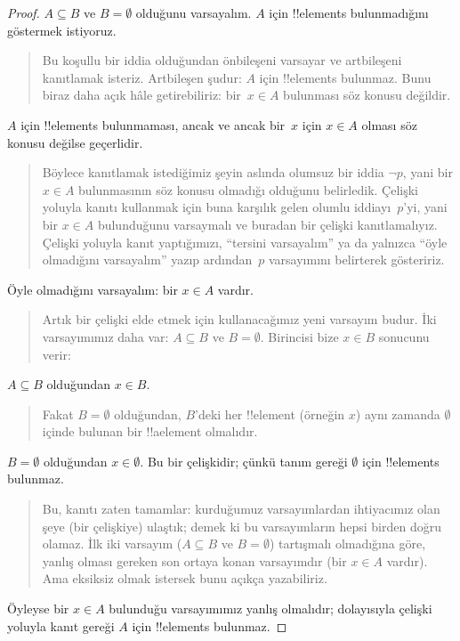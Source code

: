 \begin{proof}
  $A \subseteq B$ ve $B = \emptyset$ olduğunu varsayalım. $A$ için
  !!{element}s bulunmadığını göstermek istiyoruz.
  \begin{quote}
    Bu koşullu bir iddia olduğundan önbileşeni varsayar ve artbileşeni
    kanıtlamak isteriz. Artbileşen şudur: $A$ için !!{element}s
    bulunmaz. Bunu biraz daha açık hâle getirebiliriz: bir~$x \in A$
    bulunması söz konusu değildir.
  \end{quote}
  $A$ için !!{element}s bulunmaması, ancak ve ancak bir~$x$ için $x \in A$
  olması söz konusu değilse geçerlidir.
  \begin{quote}
    Böylece kanıtlamak istediğimiz şeyin aslında olumsuz bir iddia
    $\lnot p$, yani bir $x \in A$ bulunmasının söz konusu olmadığı
    olduğunu belirledik. Çelişki yoluyla kanıtı kullanmak için buna
    karşılık gelen olumlu iddiayı~$p$'yi, yani bir $x \in A$ bulunduğunu
    varsaymalı ve buradan bir çelişki kanıtlamalıyız. Çelişki yoluyla
    kanıt yaptığımızı, ``tersini varsayalım'' ya da yalnızca ``öyle
    olmadığını varsayalım'' yazıp ardından~$p$ varsayımını belirterek
    gösteririz.
  \end{quote}
  Öyle olmadığını varsayalım: bir $x \in A$ vardır.
  \begin{quote}
    Artık bir çelişki elde etmek için kullanacağımız yeni varsayım
    budur. İki varsayımımız daha var: $A \subseteq B$ ve $B =
    \emptyset$. Birincisi bize $x \in B$ sonucunu verir:
  \end{quote}
  $A \subseteq B$ olduğundan $x \in B$.
  \begin{quote}
    Fakat $B = \emptyset$ olduğundan, $B$'deki her !!{element} (örneğin
    $x$) aynı zamanda $\emptyset$ içinde bulunan bir !!a{element} olmalıdır.
  \end{quote}
  $B = \emptyset$ olduğundan $x \in \emptyset$. Bu bir çelişkidir;
  çünkü tanım gereği $\emptyset$ için !!{element}s bulunmaz.
  \begin{quote}
    Bu, kanıtı zaten tamamlar: kurduğumuz varsayımlardan ihtiyacımız
    olan şeye (bir çelişkiye) ulaştık; demek ki bu varsayımların hepsi
    birden doğru olamaz. İlk iki varsayım ($A \subseteq B$ ve $B =
    \emptyset$) tartışmalı olmadığına göre, yanlış olması gereken son
    ortaya konan varsayımdır (bir $x \in A$ vardır). Ama eksiksiz olmak
    istersek bunu açıkça yazabiliriz.
  \end{quote}
  Öyleyse bir $x \in A$ bulunduğu varsayımımız yanlış olmalıdır;
  dolayısıyla çelişki yoluyla kanıt gereği $A$ için !!{element}s
  bulunmaz.
\end{proof}

